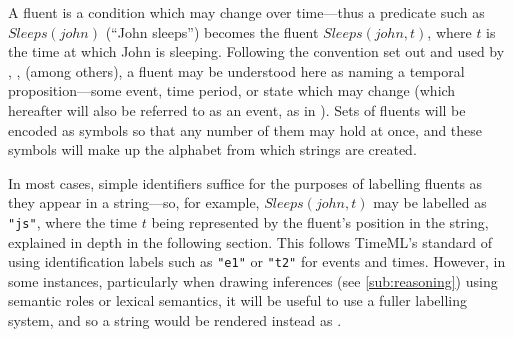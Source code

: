\documentclass[a4paper,12pt,leqno,twoside]{article}
\newcommand{\vph}[1]{\vphantom{#1}}
\newcommand{\ebox}[1]{\fbox{$\vph{'(),}#1$}}
\newcommand{\EventString}[1]{%
	\renewcommand*{\do}[1]{\ebox{##1}}%
	\PipeParser{#1}%
}
\newcommand{\citeneeded}[1][]{{\color{red}[Citation needed!#1]}}
\newcommand{\nb}[1]{{\color{red}[NB\footnote{{\color{red}#1}}]}}
\begin{document}



A fluent is a condition which may change over time---thus a predicate such as $\allowbreak{}Sleeps(john)$ (``John sleeps'') becomes the fluent $Sleeps(john, t)$, where $t$ is the time at which John is sleeping. Following the convention set out and used by \citet{Mccarthy69somephilosophical}, \citet{van2008proper}, \citet{fernando2016prior} (among others), a fluent may be understood here as naming a temporal proposition---some event, time period, or state which may change (which hereafter will also be referred to as an event, as in \citet{Pustejovsky2005}). Sets of fluents will be encoded as symbols so that any number of them may hold at once, and these symbols will make up the alphabet from which strings are created.

In most cases, simple identifiers suffice for the purposes of labelling fluents as they appear in a string---so, for example, $Sleeps(john, t)$ may be labelled as \texttt{"js"}, where the time $t$ being represented by the fluent's position in the string, explained in depth in the following section. This follows TimeML's standard \citep{timeml2005timeml,pustejovsky2010iso} of using identification labels such as \texttt{"e1"} or \texttt{"t2"} for events and times. However, in some instances, particularly when drawing inferences (see %
\cref{sub:reasoning}) using semantic roles or lexical semantics, it will be useful to use a fuller labelling system, and so a string \EventString{{}|js|{}} would be rendered instead as \EventString{{}|sleeps(john)|{}}.
\end{document}
